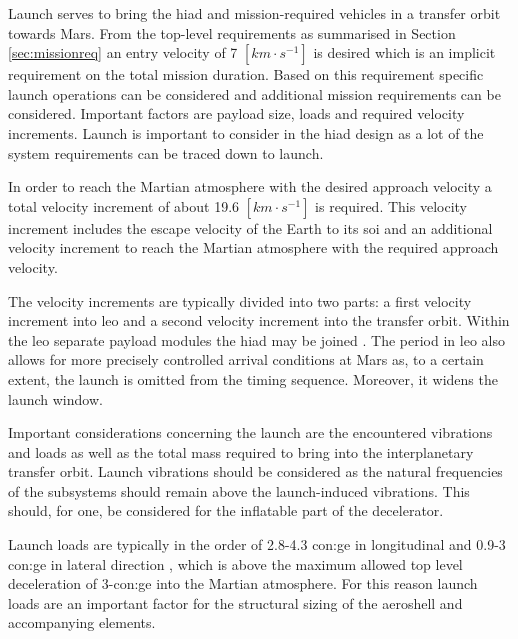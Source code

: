 Launch serves to bring the \gls{hiad} and mission-required vehicles in a transfer orbit towards Mars. From the top-level requirements as summarised in Section \ref{sec:missionreq} an entry velocity of 7 $[km\cdot s^{-1}]$ is desired which is an implicit requirement on the total mission duration.
Based on this requirement specific launch operations can be considered and additional mission requirements can be considered. Important factors are payload size, loads and required velocity increments. Launch is important to consider in the \gls{hiad} design as a lot of the system requirements can be traced down to launch.

In order to reach the Martian atmosphere with the desired approach velocity a total velocity increment of about 19.6 $[km\cdot s^{-1}]$ is required. This velocity increment includes the escape velocity of the Earth to its \gls{soi} and an additional velocity increment to reach the Martian atmosphere with the required approach velocity.

The velocity increments are typically divided into two parts: a first velocity increment into \gls{leo} and a second velocity increment into the transfer orbit. Within the \gls{leo} separate payload modules the \gls{hiad} may be joined \cite{George2009}. The period in \gls{leo} also allows for more precisely controlled arrival conditions at Mars as, to a certain extent, the launch is omitted from the timing sequence. Moreover, it widens the launch window.


Important considerations concerning the launch are the encountered vibrations and loads as well as the total mass required to bring into the interplanetary transfer orbit. Launch vibrations should be considered as the natural frequencies of the subsystems should remain above the launch-induced vibrations. This should, for one, be considered for the inflatable part of the decelerator.

Launch loads are typically in the order of 2.8-4.3 \gls{con:ge} in longitudinal and 0.9-3 \gls{con:ge} in lateral direction \cite{Wertz2011}, which is above the maximum allowed top level deceleration of 3-\gls{con:ge} into the Martian atmosphere. For this reason launch loads are an important factor for the structural sizing of the aeroshell and accompanying elements. 

